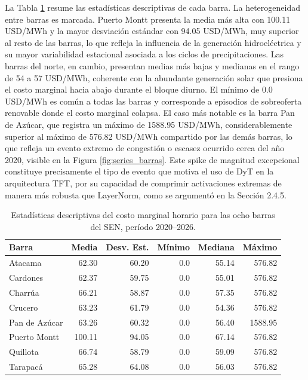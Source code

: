 La Tabla \ref{tab:estadisticas} resume las estadísticas descriptivas de cada barra. La heterogeneidad entre barras es marcada. Puerto Montt presenta la media más alta con 100.11 USD/MWh y la mayor desviación estándar con 94.05 USD/MWh, muy superior al resto de las barras, lo que refleja la influencia de la generación hidroeléctrica y su mayor variabilidad estacional asociada a los ciclos de precipitaciones. Las barras del norte, en cambio, presentan medias más bajas y medianas en el rango de 54 a 57 USD/MWh, coherente con la abundante generación solar que presiona el costo marginal hacia abajo durante el bloque diurno. El mínimo de 0.0 USD/MWh es común a todas las barras y corresponde a episodios de sobreoferta renovable donde el costo marginal colapsa. El caso más notable es la barra Pan de Azúcar, que registra un máximo de 1588.95 USD/MWh, considerablemente superior al máximo de 576.82 USD/MWh compartido por las demás barras, lo que refleja un evento extremo de congestión o escasez ocurrido cerca del año 2020, visible en la Figura \ref{fig:series_barras}. Este spike de magnitud excepcional constituye precisamente el tipo de evento que motiva el uso de DyT en la arquitectura TFT, por su capacidad de comprimir activaciones extremas de manera más robusta que LayerNorm, como se argumentó en la Sección 2.4.5.

\begin{table}[htbp]
    \centering
    \begin{tabular}{lrrrrr}
        \toprule
        Barra & Media & Desv. Est. & Mínimo & Mediana & Máximo \\
        \midrule
        Atacama       & 62.30  & 60.20 & 0.0 & 55.14 & 576.82   \\
        Cardones      & 62.37  & 59.75 & 0.0 & 55.01 & 576.82   \\
        Charrúa       & 66.21  & 58.87 & 0.0 & 57.35 & 576.82   \\
        Crucero       & 63.23  & 61.79 & 0.0 & 54.36 & 576.82   \\
        Pan de Azúcar & 63.26  & 60.32 & 0.0 & 56.40 & 1588.95 \\
        Puerto Montt  & 100.11 & 94.05 & 0.0 & 67.14 & 576.82   \\
        Quillota      & 66.74  & 58.79 & 0.0 & 59.09 & 576.82   \\
        Tarapacá      & 65.28  & 64.08 & 0.0 & 56.03 & 576.82   \\
        \bottomrule
    \end{tabular}
    \caption{Estadísticas descriptivas del costo marginal horario para las ocho barras del SEN, período 2020--2026.}
    \label{tab:estadisticas}
\end{table}

